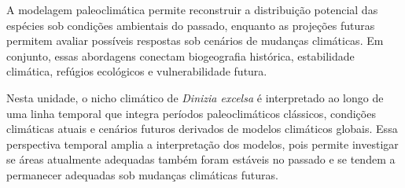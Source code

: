A modelagem paleoclimática permite reconstruir a distribuição potencial das
espécies sob condições ambientais do passado, enquanto as projeções futuras
permitem avaliar possíveis respostas sob cenários de mudanças climáticas. Em
conjunto, essas abordagens conectam biogeografia histórica, estabilidade
climática, refúgios ecológicos e vulnerabilidade futura.

Nesta unidade, o nicho climático de \textit{Dinizia excelsa} é interpretado ao
longo de uma linha temporal que integra períodos paleoclimáticos clássicos,
condições climáticas atuais e cenários futuros derivados de modelos climáticos
globais. Essa perspectiva temporal amplia a interpretação dos modelos, pois
permite investigar se áreas atualmente adequadas também foram estáveis no
passado e se tendem a permanecer adequadas sob mudanças climáticas futuras.

